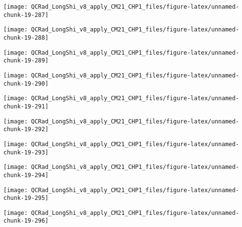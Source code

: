 \documentclass[
  10pt,
  a4paper,oneside]{article}
\begin{document}
\begin{center}\texttt{[image: QCRad\_LongShi\_v8\_apply\_CM21\_CHP1\_files/figure-latex/unnamed-chunk-19-287]} \end{center}

\begin{center}\texttt{[image: QCRad\_LongShi\_v8\_apply\_CM21\_CHP1\_files/figure-latex/unnamed-chunk-19-288]} \end{center}

\begin{center}\texttt{[image: QCRad\_LongShi\_v8\_apply\_CM21\_CHP1\_files/figure-latex/unnamed-chunk-19-289]} \end{center}

\begin{center}\texttt{[image: QCRad\_LongShi\_v8\_apply\_CM21\_CHP1\_files/figure-latex/unnamed-chunk-19-290]} \end{center}

\begin{center}\texttt{[image: QCRad\_LongShi\_v8\_apply\_CM21\_CHP1\_files/figure-latex/unnamed-chunk-19-291]} \end{center}

\begin{center}\texttt{[image: QCRad\_LongShi\_v8\_apply\_CM21\_CHP1\_files/figure-latex/unnamed-chunk-19-292]} \end{center}

\begin{center}\texttt{[image: QCRad\_LongShi\_v8\_apply\_CM21\_CHP1\_files/figure-latex/unnamed-chunk-19-293]} \end{center}

\begin{center}\texttt{[image: QCRad\_LongShi\_v8\_apply\_CM21\_CHP1\_files/figure-latex/unnamed-chunk-19-294]} \end{center}

\begin{center}\texttt{[image: QCRad\_LongShi\_v8\_apply\_CM21\_CHP1\_files/figure-latex/unnamed-chunk-19-295]} \end{center}

\begin{center}\texttt{[image: QCRad\_LongShi\_v8\_apply\_CM21\_CHP1\_files/figure-latex/unnamed-chunk-19-296]} \end{center}
\end{document}
